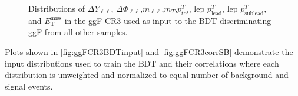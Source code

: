 \begin{figure}[!h]
{  }\hfill
  \hfill
  \hfill
{\caption{Distributions of $\Delta Y_{\ell\ell}$, $\Delta \Phi_{\ell\ell}$,$m_{\ell\ell}$,$m_T$,$p^T_{tot}$, lep $p^T_{\text{lead}}$, lep $p^T_{\text{sublead}}$, and $\ensuremath{E_{\text{T}}^{\text{miss}}}$ in the ggF CR3 used as input to the BDT discriminating ggF from all other samples.
\label{fig:ggFCR3}}}
\end{figure} 

Plots shown in \ref{fig:ggFCR3BDTinput} and \ref{fig:ggFCR3corrSB} demonstrate the input distributions used to train the BDT and their correlations where each distribution is unweighted and normalized to equal number of background and signal events. 

